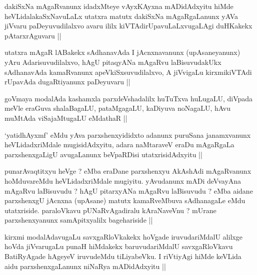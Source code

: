 
\begin{artha}
dakiSxNa mAgaRvanunx idadxMteye vAyxKAyxna mADidAdxyitu hiMde
heVLidalakaSxNavuLaLx utatxra matutx dakiSxNa mAgaRgaLanunx yAVa
jiVvaru paDeyuvudilalxvo avaru ililx kiVTAdirUpavuLaLxvugaLAgi
duHKakekx pAtarxrAguvaru ||
\end{artha}


\begin{artha}
utatxra mAgaR lABakekx sAdhanavAda I jAcnxnavanunx (upAsaneyanunx)
yAru Adarisuvudilalxvo, hAgU pitaqyANa mAgaRvu laBisuvudakUkx
sAdhanavAda kamaRvanunx apeVkiSxsuvudilalxvo, A jiVvigaLu
kirxmikiVTAdi rUpavAda dugaRtiyanunx paDeyuvaru ||
\end{artha}

\begin{artha}
goVmaya modalAda kashamxla parxdeVshadalilx huTuTxva huLugaLU, diVpada meVle eraGuva shalaBagaLU, pataMgagaLU, kaDiyuva noNagaLU, hAvu muMtAda viSajaMtugaLU eMdathaR ||
\end{artha}


\begin{artha}
`yatidhAyxmf' eMdu yAva parxshenxyididxto adanunx puruSana janamxvanunx heVLidadxriMdale mugisidAdxyitu, adara naMtaraveV eraDu mAgaRgaLa parxshenxgaLigU avugaLanunx beVpaRDisi utatxrisidAdxyitu ||
\end{artha}

\begin{artha}
punarAvaqtitxyu heVge ? eMba eraDane parxshenxyu AkAshAdi mAgaRvanunx hoMduvareMdu heVLidadxriMdale mugiyitu. yAvudanunx mADi deVvayAna mAgaRvu laBisuvudu ? hAgU pitarxyANa mAgaRvu laBisuvudu ? eMba aidane parxshenxgU jAcnxna (upAsane) matutx kamaRveMbuva sAdhanagaLe eMdu utatxriside. paraloVkavu pUNaRvAgadiralu kAraNaveVnu ? mUrane parxshenxyanunx samApitxyalilx bagehariside ||
\end{artha}


\begin{artha}
kirxmi modalAdavugaLu savxgaRloVkakekx hoVgade iruvudariMdalU alilxge hoVda jiVvarugaLu punaH hiMdakekx baruvudariMdalU savxgaRloVkavu BatiRyAgade hAgeyeV iruvudeMdu tiLiyabeVku. I riVtiyAgi hiMde keVLida aidu parxshenxgaLanunx niNaRya mADidAdxyitu ||
\end{artha}

